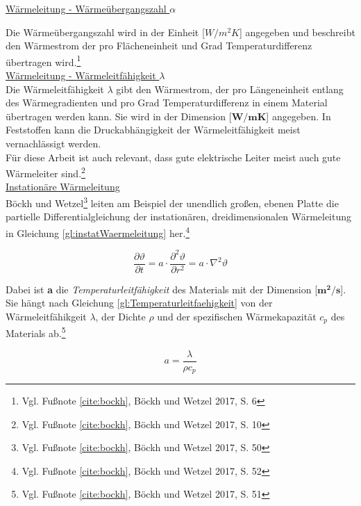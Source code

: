 \underline{Wärmeleitung - Wärmeübergangszahl $\alpha$}

Die Wärmeübergangszahl wird in der Einheit [$W/m^{2}K$] angegeben und beschreibt den Wärmestrom der pro Flächeneinheit und Grad Temperaturdifferenz übertragen wird.\footnote{Vgl. Fußnote \ref{cite:bockh}, Böckh und Wetzel 2017, S. 6}\\

\underline{Wärmeleitung - Wärmeleitfähigkeit $\lambda$}
\\

Die Wärmeleitfähigkeit $\lambda$ gibt den Wärmestrom, der pro Längeneinheit entlang des Wärmegradienten und pro Grad Temperaturdifferenz in einem Material übertragen werden kann. Sie wird in der Dimension [$\mathbf{W/mK}$] angegeben. In Feststoffen kann die Druckabhängigkeit der Wärmeleitfähigkeit meist vernachlässigt werden. \\
Für diese Arbeit ist auch relevant, dass gute elektrische Leiter meist auch gute Wärmeleiter sind.\footnote{Vgl. Fußnote \ref{cite:bockh}, Böckh und Wetzel 2017, S. 10} \\

\underline{Instationäre Wärmeleitung}
\\

Böckh und Wetzel\footnote{Vgl. Fußnote \ref{cite:bockh}, Böckh und Wetzel 2017, S. 50} leiten am Beispiel der unendlich großen, ebenen Platte die partielle Differentialgleichung der instationären, dreidimensionalen Wärmeleitung in Gleichung \ref{gl:instatWaermeleitung} her.\footnote{Vgl. Fußnote \ref{cite:bockh}, Böckh und Wetzel 2017, S. 52}

\begin{equation}
	\frac{\partial \vartheta}{\partial t} = a \cdot \frac{\partial^{2} \vartheta}{\partial r^{2}} = a \cdot \nabla^{2} \vartheta \label{gl:instatWaermeleitung}
\end{equation}

Dabei ist \textbf{a} die \textit{Temperaturleitfähigkeit} des Materials mit der Dimension [$\mathbf{m^{2}/s}$]. Sie hängt nach Gleichung \ref{gl:Temperaturleitfaehigkeit} von der Wärmeleitfähikgeit $\lambda$, der Dichte $\rho$ und der spezifischen Wärmekapazität $c_{p}$ des Materials ab.\footnote{Vgl. Fußnote \ref{cite:bockh}, Böckh und Wetzel 2017, S. 51}

\begin{equation}
	a = \frac{\lambda}{\rho c_{p}} \label{gl:Temperaturleitfaehigkeit}
\end{equation}


